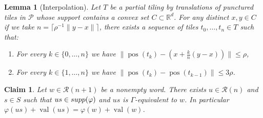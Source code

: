 \documentclass[10pt,a4paper]{amsart}
\newtheorem{lemma}{Lemma}
\newtheorem{claim}{Claim}
\newcommand{\PP}{\mathcal{P}}
\newcommand{\RR}{\mathbb{R}}
\newcommand{\norm}[1]{\|{#1}\|}
\newcommand{\pos}{\operatorname{pos}}
\newcommand{\supp}{\textnormal{supp}}
\newcommand{\val}{\operatorname{val}}
\begin{document}
\begin{lemma}[Interpolation]
\label{lem:sausage}
    Let $T$ be a partial tiling by translations of punctured tiles in $\PP$ whose support contains a convex set $C\subset \RR^d$. For any distinct $x,y \in C$ if we take $n = \lceil  \rho^{-1}\norm{y-x}\rceil$, there exists a sequence of tiles $t_0,\dots, t_{n}  \in T$ such that:
    \begin{enumerate}
        \item For every $k \in \{0,\dots,n\}$ we have $\norm{\pos(t_k)- (x +\frac{k}{n}(y-x))}\leq \rho$,
        \item For every $k \in \{1,\dots,n\}$ we have $\norm{\pos(t_k)-\pos(t_{k-1})}\leq 3\rho$.
        \end{enumerate}
\end{lemma}

    \begin{claim}\label{claim:forma_canonica}
        Let $w\in \mathcal{R}(n+1)$ be a nonempty word. There exists $u \in \mathcal{R}(n)$ and $s \in S$ such that $us \in \supp(\varphi)$ and $us$ is $\Gamma$-equivalent to $w$. In particular $\varphi(us)+\val(us) = \varphi(w)+\val(w)$.
    \end{claim}
\end{document}
